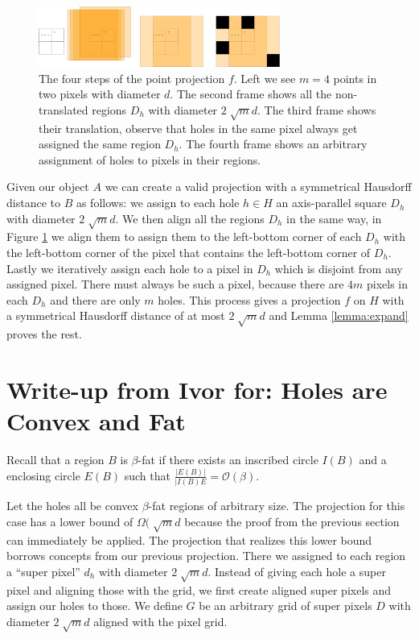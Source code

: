 \documentclass{paper}
\begin{document}
{\begin{figure}[H]
\centering
\includegraphics[width=300px]{Figures/pointprojection.png}
\caption{The four steps of the point projection $f$. Left we see $m=4$ points in two pixels with diameter $d$. The second frame shows all the non-translated regions $D_h$ with diameter $2\sqrt[]{m}d$. The third frame shows their translation, observe that holes in the same pixel always get assigned the same region $D_h$. The fourth frame shows an arbitrary assignment of holes to pixels in their regions.}
\label{fig:pointprojection}
\end{figure}


Given our object $A$ we can create a valid projection with a symmetrical Hausdorff distance to $B$ as follows: we assign to each hole $h \in H$ an axis-parallel square $D_h$ with diameter $2\sqrt[]{m}d$. We then align all the regions $D_h$ in the same way, in Figure \ref{fig:pointprojection} we align them to assign them to the left-bottom corner of each $D_h$ with the left-bottom corner of the pixel that contains the left-bottom corner of $D_h$. Lastly we iteratively assign each hole to a pixel in $D_h$ which is disjoint from any assigned pixel. There must always be such a pixel, because there are $4m$ pixels in each $D_h$ and there are only $m$ holes. This process gives a projection $f$ on $H$ with a symmetrical Hausdorff distance of at most $2\sqrt[]{m}d$ and Lemma \ref{lemma:expand} proves the rest.



\section{Write-up from Ivor for: Holes are Convex and Fat}



Recall that a region $B$ is $\beta$-fat if there exists an inscribed circle $I(B)$ and a enclosing circle $E(B)$ such that $\frac{|E(B)|}{|I(B)E} = \mathcal{O}(\beta)$.

Let the holes all be convex $\beta$-fat regions of arbitrary size. The projection for this case has a lower bound of $\Omega(\sqrt[]{m}d$ because the proof from the previous section can immediately be applied. The projection that realizes this lower bound borrows concepts from our previous projection. There we assigned to each region a ``super pixel'' $d_h$ with diameter $2\sqrt[]{m}d$. Instead of giving each hole a super pixel and aligning those with the grid, we first create aligned super pixels and assign our holes to those. We define $G$ be an arbitrary grid of super pixels $D$ with diameter $2\sqrt[]{m}d$ aligned with the pixel grid. 

}
\end{document}
